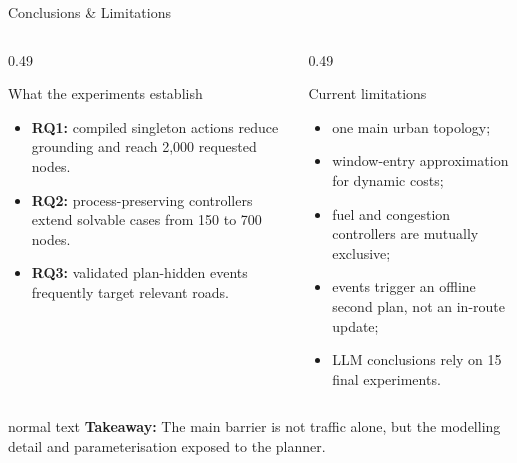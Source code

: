 \documentclass[10pt,aspectratio=169]{beamer}
\newcommand{\takeaway}[1]{%
  \begin{beamercolorbox}[rounded=true,sep=0.65ex,wd=\linewidth]{normal text}%
    \textbf{Takeaway:} #1
  \end{beamercolorbox}%
}
\begin{document}
\begin{frame}{Conclusions \& Limitations}
  \begin{columns}[T,onlytextwidth]
    \begin{column}{0.49\textwidth}
      \begin{beamerboxesrounded}[upper=block title,lower=block body,shadow=true]{What the experiments establish}
        \begin{itemize}
          \item \textbf{RQ1:} compiled singleton actions reduce grounding and reach 2,000 requested nodes.
          \item \textbf{RQ2:} process-preserving controllers extend solvable cases from 150 to 700 nodes.
          \item \textbf{RQ3:} validated plan-hidden events frequently target relevant roads.
        \end{itemize}
      \end{beamerboxesrounded}
    \end{column}
    \begin{column}{0.49\textwidth}
      \begin{beamerboxesrounded}[upper=block title,lower=block body,shadow=true]{Current limitations}
        \begin{itemize}
          \item one main urban topology;
          \item window-entry approximation for dynamic costs;
          \item fuel and congestion controllers are mutually exclusive;
          \item events trigger an offline second plan, not an in-route update;
          \item LLM conclusions rely on 15 final experiments.
        \end{itemize}
      \end{beamerboxesrounded}
    \end{column}
  \end{columns}

  \vspace{0.35cm}
  \takeaway{The main barrier is not traffic alone, but the modelling detail and parameterisation exposed to the planner.}
\end{frame}
\end{document}
